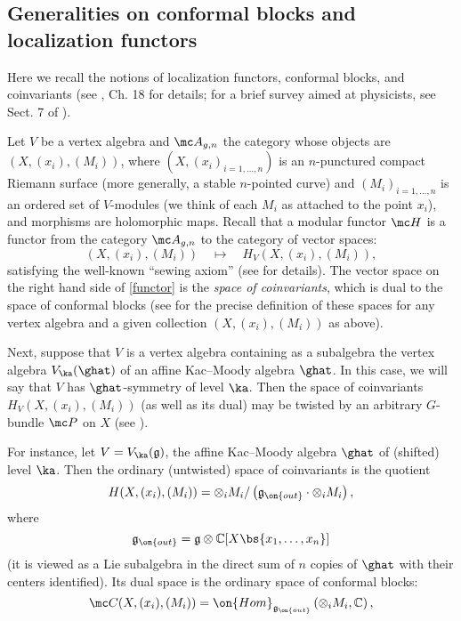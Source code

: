 \documentclass[11pt,reqno]{amsart}
\theoremstyle{plain}
\numberwithin{equation}{section}
\newcommand{\C}{\mathbb{C}}
\newcommand{\g}{\mathfrak{g}}
\theoremstyle{definition}
\begin{document}
\subsection{Generalities on conformal blocks and localization
  functors}    \label{gener}

Here we recall the notions of localization functors, conformal blocks,
and coinvariants (see \cite{FB}, Ch. 18 for details; for a brief
survey aimed at physicists, see Sect. 7 of \cite{F:review}).

Let $V$ be a vertex algebra and ${\mc A}_{g,n}$ the category whose
objects are $(X,(x_i),(M_i))$, where $(X,(x_i)_{i=1,\ldots,n})$ is an
$n$-punctured compact Riemann surface (more generally, a stable
$n$-pointed curve) and $(M_i)_{i=1,\ldots,n}$ is an ordered set of
$V$-modules (we think of each $M_i$ as attached to the point $x_i$),
and morphisms are holomorphic maps. Recall \cite{Segal} that a modular
functor ${\mc H}$ is a functor from the category ${\mc A}_{g,n}$ to
the category of vector spaces:
\begin{equation}    \label{functor}
(X,(x_i),(M_i)) \quad \mapsto \quad H_V(X,(x_i),(M_i)),
\end{equation}
satisfying the well-known ``sewing axiom'' (see \cite{Segal} for
details). The vector space on the right hand side of \eqref{functor}
is the {\em space of coinvariants}, which is dual to the space of
conformal blocks (see \cite{FB,F:review} for the precise definition of
these spaces for any vertex algebra and a given collection
$(X,(x_i),(M_i))$ as above).

Next, suppose that $V$ is a vertex algebra containing as a subalgebra
the vertex algebra $V_\ka(\ghat)$ of an affine Kac--Moody algebra
$\ghat$. In this case, we will say that $V$ has $\ghat$-symmetry of
level $\ka$. Then the space of coinvariants $H_V(X,(x_i),(M_i))$ (as
well as its dual) may be twisted by an arbitrary $G$-bundle ${\mc P}$
on $X$ (see \cite{FB,F:review}).

For instance, let $V = V_\ka(\g)$, the affine Kac--Moody algebra
$\ghat$ of (shifted) level $\ka$. Then the ordinary (untwisted) space
of coinvariants is the quotient
$$
H(X,(x_i),(M_i)) = \otimes_i M_i / \left( \g_{\on{out}} \cdot
  \otimes_i M_i \right),
$$
where
$$
\g_{\on{out}} = \g \otimes \C[X \bs \{ x_1,\ldots,x_n \}]
$$
(it is viewed as a Lie subalgebra in the direct sum of $n$ copies of
$\ghat$ with their centers identified). Its dual space is the ordinary
space of conformal blocks:
$$
{\mc C}(X,(x_i),(M_i)) = \on{Hom}_{\g_{\on{out}}}\left(\otimes_i
  M_i,\C\right),
$$
\end{document}
